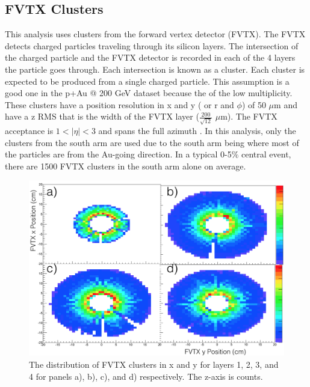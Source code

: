 \subsection{FVTX Clusters}
This analysis uses clusters from the forward vertex detector (FVTX). The FVTX detects charged particles traveling through its silicon layers. The intersection of the charged particle and the FVTX detector is recorded in each of the 4 layers the particle goes through. Each intersection is known as a cluster. Each cluster is expected to be produced from a single charged particle. This assumption is a good one in the p+Au @ 200 GeV dataset because the of the low multiplicity. These clusters have a position resolution in x and y ( or r and $\phi$) of 50 $\mu$m  and have a z RMS that is the width of the FVTX layer ($\frac{200}{\sqrt{12}}$ $\mu$m). The FVTX acceptance is $1 < | \eta | < 3$ and spans the full azimuth \cite{Aidala201444}. In this analysis, only the clusters from the south arm are used due to the south arm being where most of the particles are from the Au-going direction. In a typical 0-5$\%$ central event, there are 1500 FVTX clusters in the south arm alone on average.
\begin{figure}[!h]
\begin{center}
\includegraphics[width=0.55\linewidth]{figs/fvtx_clus_xy.png}
\caption{The distribution of FVTX clusters in x and y for layers 1, 2, 3, and 4 for panels a), b), c), and d) respectively. The z-axis is counts.}
\label{fig:dc_mom_res}
\end{center}
\end{figure}

